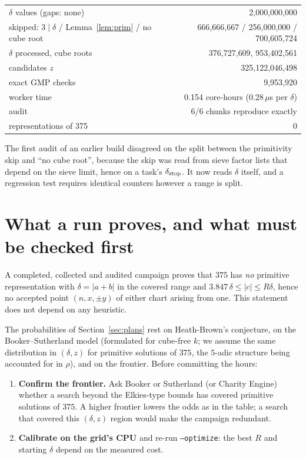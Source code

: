 \documentclass[11pt,a4paper]{article}
\theoremstyle{remark}
\begin{document}
\begin{center}
\begin{tabular}{lr}
\toprule
$\delta$ values (gaps: none) & 2{,}000{,}000{,}000\\
skipped: $3\mid\delta$ / Lemma~\ref{lem:prim} / no cube root & 666{,}666{,}667 / 256{,}000{,}000 / 700{,}605{,}724\\
$\delta$ processed, cube roots & 376{,}727{,}609, 953{,}402{,}561\\
candidates $z$ & 325{,}122{,}046{,}498\\
exact GMP checks & 9{,}953{,}920\\
worker time & 0.154 core-hours (0.28\,$\mu$s per $\delta$)\\
audit & 6/6 chunks reproduce exactly\\
representations of 375 & 0\\
\bottomrule
\end{tabular}
\end{center}

\noindent The first audit of an earlier build disagreed on the split between the primitivity skip
and ``no cube root'', because the skip was read from sieve factor lists that depend on the sieve
limit, hence on a task's $\delta_{\rm stop}$. It now reads $\delta$ itself, and a regression test
requires identical counters however a range is split.

\section{What a run proves, and what must be checked first}\label{sec:limits}

A completed, collected and audited campaign proves that $375$ has \emph{no} primitive
representation with $\delta=|a+b|$ in the covered range and $3.847\,\delta\le|c|\le R\delta$, hence
no accepted point $(n,x,\pm y)$ of either chart arising from one. This statement does not depend on
any heuristic.

The probabilities of Section~\ref{sec:plans} rest on Heath-Brown's conjecture, on the
Booker--Sutherland model (formulated for cube-free $k$; we assume the same distribution in
$(\delta,z)$ for primitive solutions of $375$, the $5$-adic structure being accounted for in
$\rho$), and on the frontier. Before committing the hours:
\begin{enumerate}[leftmargin=*]
  \item \textbf{Confirm the frontier.} Ask Booker or Sutherland (or Charity Engine) whether a search
  beyond the Elkies-type bounds has covered primitive solutions of $375$. A higher frontier lowers
  the odds as in the table; a search that covered this $(\delta,z)$ region would make the campaign
  redundant.
  \item \textbf{Calibrate on the grid's CPU} and re-run \texttt{--optimize}: the best $R$ and starting
  $\delta$ depend on the measured cost.
\end{enumerate}
\end{document}
